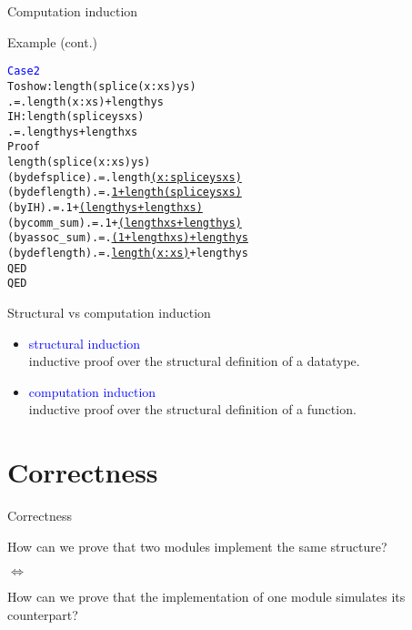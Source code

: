 \documentclass{beamer}
\begin{document}
\begin{frame}[fragile]{Computation induction}

\begin{exampleblock}{Example (cont.)}
\small\begin{alltt}
\textcolor{blue}{Case 2}\pause
  To show: length (splice (x:xs) ys)
           .=. length (x:xs) + length ys\pause
  IH:      length (splice ys xs)
           .=. length ys + length xs
  Proof
                        length (splice (x:xs) ys)\pause
    (by def splice) .=. length \underline{(x : splice ys xs)}\pause
    (by def length) .=. \underline{1 + length (splice ys xs)}\pause
    (by IH)         .=. 1 + \underline{(length ys + length xs)}\pause
    (by comm_sum)   .=. 1 + \underline{(length xs + length ys)}\pause
    (by assoc_sum)  .=. \underline{(1 + length xs) + length ys}\pause
    (by def length) .=. \underline{length (x:xs)} + length ys
  QED
QED
\end{alltt}\normalsize
\end{exampleblock}

\end{frame}

\begin{frame}{Structural vs computation induction}

\begin{itemize}
    \item \textcolor{blue}{structural induction} \\ inductive proof over the structural definition of a datatype.
    \item \textcolor{blue}{computation induction} \\ inductive proof over the structural definition of a function.
\end{itemize}

\end{frame}

\section{Correctness}

\begin{frame}{Correctness}

\begin{block}{\centering How can we prove that two modules implement the same structure?}
\end{block}\pause
\begin{block}{\centering $\iff$}
\end{block}
\begin{block}{\centering How can we prove that the implementation of one module simulates its counterpart?}
\end{block}

\end{frame}
\end{document}
